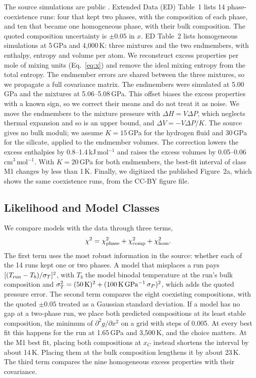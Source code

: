 The source simulations are public \cite{gilmore2026data}. Extended Data (ED) Table~1 lists
14 phase-coexistence runs: four that kept two phases, with the composition of each phase, and
ten that became one homogeneous phase, with their bulk composition. The quoted composition
uncertainty is $\pm0.05$ in $x$. ED Table~2 lists homogeneous simulations at 5\,GPa and
4,000\,K: three mixtures and the two endmembers, with enthalpy, entropy and volume per atom.
We reconstruct excess properties per mole of mixing units (Eq.~\ref{eq:x}) and remove the
ideal mixing entropy from the total entropy. The endmember errors are shared between the
three mixtures, so we propagate a full covariance matrix. The endmembers were simulated at
5.00\,GPa and the mixtures at 5.06--5.08\,GPa. This offset biases the excess properties with
a known sign, so we correct their means and do not treat it as noise. We move the endmembers
to the mixture pressure with $\Delta H = V\Delta P$, which neglects thermal expansion and so
is an upper bound, and $\Delta V = -V\Delta P/K$. The source gives no bulk moduli; we assume
$K = 15$\,GPa for the hydrogen fluid and 30\,GPa for the silicate, applied to the endmember
volumes. The correction lowers the excess enthalpies by 0.8--1.4\,kJ\,mol$^{-1}$ and raises the
excess volumes by 0.05--0.06\,cm$^3$\,mol$^{-1}$. With $K = 20$\,GPa for both endmembers, the
best-fit interval of class M1 changes by less than 1\,K. Finally, we digitized the published
Figure~2a, which shows the same coexistence runs, from the CC-BY figure file.

\subsection{Likelihood and Model Classes}

We compare models with the data through three terms,
\begin{equation}
\chi^2 = \chi^2_{\rm phase} + \chi^2_{\rm comp} + \chi^2_{\rm hom}.
\label{eq:chi2}
\end{equation}
The first term uses the most robust information in the source: whether each of the 14 runs
kept one or two phases. A model that misplaces a run pays
$[(T_{\rm run}-T_b)/\sigma_T]^2$, with $T_b$ the model binodal temperature at the run's bulk
composition and $\sigma_T^2 = (50\,{\rm K})^2 + (100\,{\rm K\,GPa^{-1}}\,\sigma_P)^2$, which
adds the quoted pressure error. The second term compares the eight coexisting compositions,
with the quoted $\pm0.05$ treated as a Gaussian standard deviation. If a model has no gap at a
two-phase run, we place both predicted compositions at its least stable composition, the
minimum of $\partial^2 g/\partial x^2$ on a grid with steps of 0.005. At every best fit this
happens for the run at 1.65\,GPa and 3,500\,K, and the choice matters. At the M1 best fit,
placing both compositions at $x_C$ instead shortens the interval by about 14\,K. Placing them at
the bulk composition lengthens it by about 23\,K. The third term compares the nine homogeneous
excess properties with their covariance.


